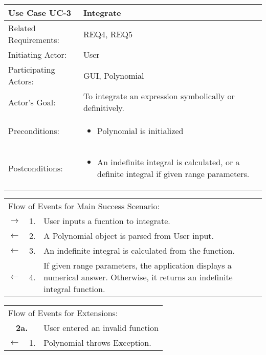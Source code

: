\documentclass[11pt,letterpaper]{article}
\begin{document}
\newpage
\begin{center}
\begin{tabular}{p{1.5in}p{5in}}
\hline
\textbf{Use Case UC-3}     & \textbf{Integrate} \\ \hline
Related Requirements: & REQ4, REQ5 \\
Initiating Actor:     & User \\
Participating Actors: & GUI, Polynomial \\
Actor's Goal:          & To integrate an expression symbolically or definitively. \\
Preconditions:         & \begin{itemize}[nosep]
		      \item  Polynomial is initialized
                         \end{itemize} \\
Postconditions:        & \begin{itemize}[nosep]
                         \item An indefinite integral is calculated, or a definite integral if given range parameters.
                         \end{itemize} \\ \hline
\end{tabular}

\begin{tabular}{p{.25in}p{.25in}p{5.8in}}
\multicolumn{3}{l}{Flow of Events for Main Success Scenario:} \\
$\rightarrow$ & 1. & User inputs a fucntion to integrate.\\
$\leftarrow$  & 2. & A Polynomial object is parsed from User input.\\
$\leftarrow$  & 3. & An indefinite integral is calculated from the function.\\
$\leftarrow$  & 4. & If given range parameters, the application displays a numerical answer. Otherwise, it returns an indefinite integral function. 
\end{tabular}

\begin{tabular}{p{.25in}p{.25in}p{5.8in}}
\multicolumn{3}{l}{Flow of Events for Extensions:} \\
\multicolumn{2}{c}{\textbf{2a.}} & User entered an invalid function \\
$\leftarrow$  & 1.           & Polynomial throws Exception.\\
\end{tabular}
\end{center}
\end{document}
